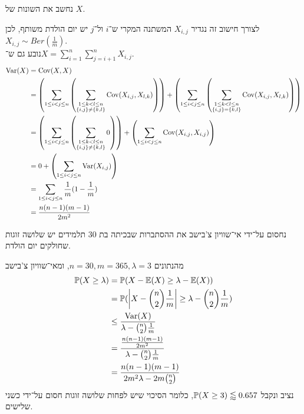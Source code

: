 \subquestion{}
נחשב את השונות של $X$.
\begin{solution}
	לצורך חישוב זה נגדיר $X_{i, j}$ המשתנה המקרי ש־$i$ ול־$j$ יש יום הולדת משותף, לכן $X_{i, j} \sim Ber(\frac{1}{m})$. \\
	נובע גם ש־$X = \sum_{i = 1}^{n} \sum_{j = i + 1}^{n} X_{i, j}$.
	\begin{align*}
		\operatorname{Var}(X)
		& = \operatorname{Cov}(X, X) \\
		& = \left( \sum_{1 \le i < j \le n} \left( \sum_{\substack{1 \le k < l \le n \\ \{i, j\} \ne \{k, l\}}} \operatorname{Cov}(X_{i, j}, X_{l, k}) \right) \right)
		+ \left( \sum_{1 \le i < j \le n} \left( \sum_{\substack{1 \le k < l \le n \\ \{i, j\} = \{k, l\}}} \operatorname{Cov}(X_{i, j}, X_{l, k}) \right) \right) \\
		& = \left( \sum_{1 \le i < j \le n} \left( \sum_{\substack{1 \le k < l \le n \\ \{i, j\} \ne \{k, l\}}} 0 \right) \right) + \left( \sum_{1 \le i < j \le n}  \operatorname{Cov}(X_{i, j}, X_{i, j}) \right) \\
		& = 0 + \left( \sum_{1 \le i < j \le n}  \operatorname{Var}(X_{i, j}) \right) \\
		& = \sum_{1 \le i < j \le n} \frac{1}{m} (1 - \frac{1}{m}) \\
		& = \frac{n(n - 1)(m - 1)}{2m^2}
	\end{align*}
\end{solution}

\subquestion{}
נחסום על־ידי אי־שוויון צ'בישב את ההסתברות שבכיתה בת 30 תלמידים יש שלושה זוגות שחולקים יום הולדת.
\begin{solution}
	מהנתונים $n = 30, m = 365, \lambda = 3$, ומאי־שוויון צ'בישב
	\begin{align*}
		\mathbb{P}(X \ge \lambda)
		& = \mathbb{P}(X - \mathbb{E}(X) \ge \lambda - \mathbb{E}(X)) \\
		& = \mathbb{P}(\left\lvert X - \binom{n}{2} \frac{1}{m} \right\rvert \ge \lambda - \binom{n}{2} \frac{1}{m}) \\
		& \le \frac{\operatorname{Var}(X)}{\lambda - \binom{n}{2} \frac{1}{m}} \\
		& = \frac{\frac{n(n - 1)(m - 1)}{2m^2}}{\lambda - \binom{n}{2} \frac{1}{m}} \\
		& = \frac{n(n - 1)(m - 1)}{2m^2 \lambda - 2m \binom{n}{2}}
	\end{align*}
	נציב ונקבל $\mathbb{P}(X \ge 3) \lessapprox 0.657$, כלומר הסיכוי שיש לפחות שלושה זוגות חסום על־ידי כשני שלישים.
\end{solution}

